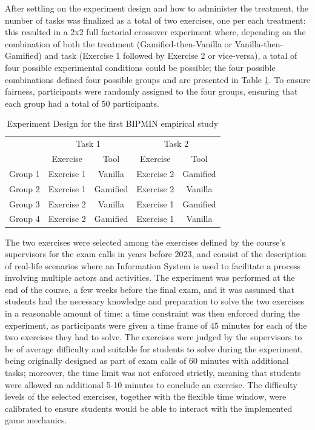 After settling on the experiment design and how to administer the treatment, the number of tasks was finalized as a total of two exercises, one per each treatment: this resulted in a 2x2 full factorial crossover experiment where, depending on the combination of both the treatment (Gamified-then-Vanilla or Vanilla-then-Gamified) and task (Exercise 1 followed by Exercise 2 or vice-versa), a total of four possible experimental conditions could be possible; the four possible combinations defined four possible groups and are presented in Table \ref{tab:exp_design_3}. To ensure fairness, participants were randomly assigned to the four groups, ensuring that each group had a total of 50 participants.


\begin{table}[H]
\centering
\footnotesize
\caption{Experiment Design for the first BIPMIN empirical study}
\label{tab:exp_design_3}
\begin{tabular}{l c c c c}
\toprule
& \multicolumn{2}{c}{Task 1} & \multicolumn{2}{c}{Task 2} \\
& Exercise & Tool & Exercise & Tool \\
\midrule
Group 1 & Exercise 1 & Vanilla & Exercise 2 & Gamified \\
Group 2 & Exercise 1 & Gamified & Exercise 2 & Vanilla \\
Group 3 & Exercise 2 & Vanilla & Exercise 1 & Gamified \\
Group 4 & Exercise 2 & Gamified & Exercise 1 & Vanilla \\
\bottomrule
\end{tabular}
\end{table}

The two exercises were selected among the exercises defined by the course's supervisors for the exam calls in years before 2023, and consist of the description of real-life scenarios where an Information System is used to facilitate a process involving multiple actors and activities. The experiment was performed at the end of the course, a few weeks before the final exam, and it was assumed that students had the necessary knowledge and preparation to solve the two exercises in a reasonable amount of time: a time constraint was then enforced during the experiment, as participants were given a time frame of 45 minutes for each of the two exercises they had to solve. The exercises were judged by the supervisors to be of average difficulty and suitable for students to solve during the experiment, being originally designed as part of exam calls of 60 minutes with additional tasks; moreover, the time limit was not enforced strictly, meaning that students were allowed an additional 5-10 minutes to conclude an exercise. The difficulty levels of the selected exercises, together with the flexible time window, were calibrated to ensure students would be able to interact with the implemented game mechanics. 

